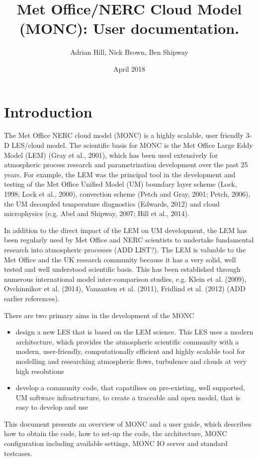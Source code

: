 \documentclass[a4paper,11pt]{article}
\title{Met Office/NERC Cloud Model (MONC): User documentation.}
\author{Adrian Hill, Nick Brown, Ben Shipway}
\date{April 2018} %
\begin{document}
\maketitle
\newpage
\tableofcontents
\newpage

\section{Introduction}

The Met Office NERC cloud model (MONC) is a highly scalable, user friendly
3-D LES/cloud model. The scientific basis for MONC is the Met Office Large Eddy Model
(LEM) (Gray et al., 2001),
which  has been used extensively for atmospheric process research and
parametrization development over the past 25 years. For example, the LEM was the
principal tool in the development and testing of the Met Office Unified Model
(UM) boundary layer scheme (Lock, 1998; Lock et al., 2000), convection scheme
(Petch and Gray, 2001; Petch, 2006), the UM decoupled temperature diagnostics (Edwards, 2012)
and cloud microphysics (e.g. Abel and Shipway, 2007; Hill et al., 2014).

In addition to the direct impact of the LEM on UM development, the LEM has been
regularly used by Met Office and NERC scientists to undertake fundamental research
into atmospheric processes (ADD LIST?). The LEM is valuable to the Met Office and
the UK research community because it has a very solid, well tested and well
understood scientific
basis. This has been established through numerous
international model inter-comparison studies, e.g. Klein et al. (2009),
Ovchinnikov et al. (2014), Vanzanten et al. (2011), Fridlind et al. (2012)
(ADD earlier references).

There are two primary aims in the development of the MONC
\begin{itemize}
  \item {design a new LES that is based on the LEM science. This LES uses a
   modern architecture, which provides the atmospheric scientific community
   with a modern, user-friendly, computationally efficient and highly scalable
   tool for modelling and researching atmospheric flows, turbulence and
   clouds at very high resolutions}
   \item{develop a community code, that capatilises on
   pre-existing, well supported, UM software infrastructure, to create a
   traceable and open model, that is easy to develop and use}
\end{itemize}

This document presents an overview of MONC and a user guide, which describes how to
obtain the code, how to set-up the code, the architecture, MONC configuration
including available settings, MONC IO server and standard testcases.
\end{document}
